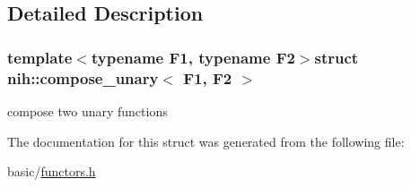 \subsection{\-Detailed \-Description}
\subsubsection*{template$<$typename F1, typename F2$>$struct nih\-::compose\-\_\-unary$<$ F1, F2 $>$}

compose two unary functions 

\-The documentation for this struct was generated from the following file\-:\begin{DoxyCompactItemize}
\item 
basic/\hyperlink{functors_8h}{functors.\-h}\end{DoxyCompactItemize}
